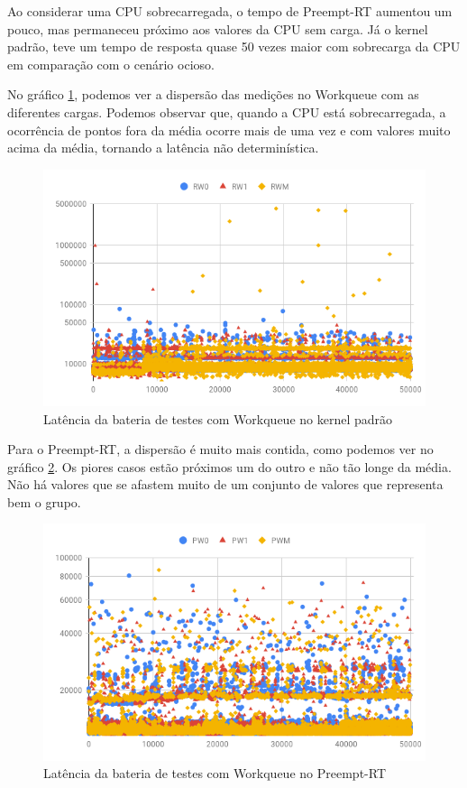 Ao considerar uma CPU sobrecarregada, o tempo de Preempt-RT aumentou um pouco, mas permaneceu próximo aos valores da CPU sem carga. Já o kernel padrão, teve um tempo de resposta quase 50 vezes maior com sobrecarga da CPU em comparação com o cenário ocioso.

No gráfico \ref{grafico:r-workqueue}, podemos ver a dispersão das medições no Workqueue com as diferentes cargas. Podemos observar que, quando a CPU está sobrecarregada, a ocorrência de pontos fora da média ocorre mais de uma vez e com valores muito acima da média, tornando a latência não determinística.

\begin{figure}[!p]
    \centering
    \includegraphics[width=\textwidth]{graficos/rw-scatter.png}
    \caption{Latência da bateria de testes com Workqueue no kernel padrão}
    \label{grafico:r-workqueue}
\end{figure}

Para o Preempt-RT, a dispersão é muito mais contida, como podemos ver no gráfico \ref{grafico:p-workqueue}. Os piores casos estão próximos um do outro e não tão longe da média. Não há valores que se afastem muito de um conjunto de valores que representa bem o grupo.

\begin{figure}[!p]
    \centering
    \includegraphics[width=\textwidth]{graficos/pw-scatter.png}
    \caption{Latência da bateria de testes com Workqueue no Preempt-RT}
    \label{grafico:p-workqueue}
\end{figure}

